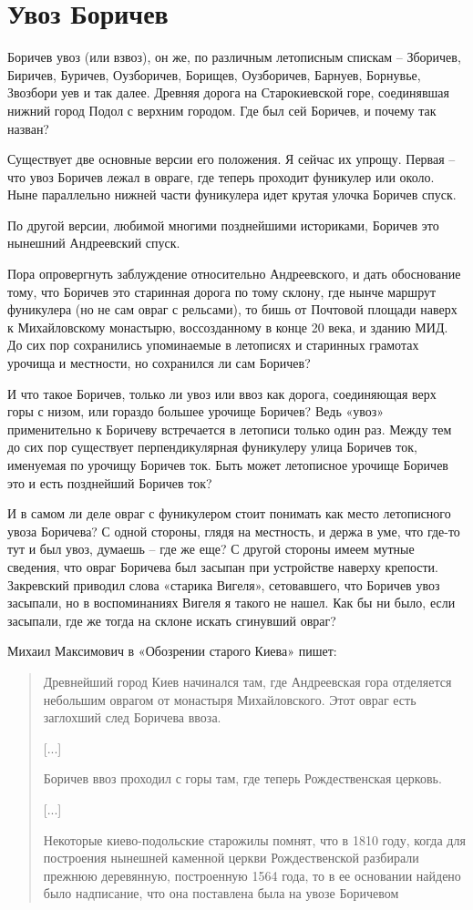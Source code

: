 \chapter {Увоз Боричев}

Боричев увоз (или взвоз), он же, по различным летописным спискам – Зборичев, Биричев, Буричев, Оузборичев, Борищев, Оузборичев, Барнуев, Борнувье, Звозбори уев и так далее. Древняя дорога на Старокиевской горе, соединявшая нижний город Подол с верхним городом. Где был сей Боричев, и почему так назван?

Существует две основные версии его положения. Я сейчас их упрощу. Первая – что увоз Боричев лежал в овраге, где теперь проходит фуникулер или около. Ныне параллельно нижней части фуникулера идет крутая улочка Боричев спуск. 

По другой версии, любимой многими позднейшими историками, Боричев это нынешний Андреевский спуск.

Пора опровергнуть заблуждение относительно Андреевского, и дать обоснование тому, что Боричев это старинная дорога по тому склону, где нынче маршрут фуникулера (но не сам овраг с рельсами), то бишь от Почтовой площади наверх к Михайловскому монастырю, воссозданному в конце 20 века, и зданию МИД. До сих пор сохранились упоминаемые в летописях и старинных грамотах урочища и местности, но сохранился ли сам Боричев?

И что такое Боричев, только ли увоз или ввоз как дорога, соединяющая верх горы с низом, или гораздо большее урочище Боричев? Ведь «увоз» применительно к Боричеву встречается в летописи только один раз. Между тем до сих пор существует перпендикулярная фуникулеру улица Боричев ток, именуемая по урочищу Боричев ток. Быть может летописное урочище Боричев это и есть позднейший Боричев ток?

И в самом ли деле овраг с фуникулером стоит понимать как место летописного увоза Боричева? С одной стороны, глядя на местность, и держа в уме, что где-то тут и был увоз, думаешь – где же еще? С другой стороны имеем мутные сведения, что овраг Боричева был засыпан при устройстве наверху крепости. Закревский приводил слова «старика Вигеля», сетовавшего, что Боричев увоз засыпали, но в воспоминаниях Вигеля я такого не нашел. Как бы ни было, если засыпали, где же тогда на склоне искать сгинувший овраг?

Михаил Максимович в «Обозрении старого Киева»\cite{max} пишет:

\begin{quotation}
Древнейший город Киев начинался там, где Андреевская гора отделяется небольшим оврагом от монастыря Михайловского. Этот овраг есть заглохший след Боричева ввоза. 

[...]

Боричев ввоз проходил с горы там, где теперь Рождественская церковь.

[...]

Некоторые киево-подольские старожилы помнят, что в 1810 году, когда для построения нынешней каменной церкви Рождественской разбирали прежнюю деревянную, построенную 1564 года, то в ее основании найдено было надписание, что она поставлена была на увозе Боричевом
\end{quotation}

